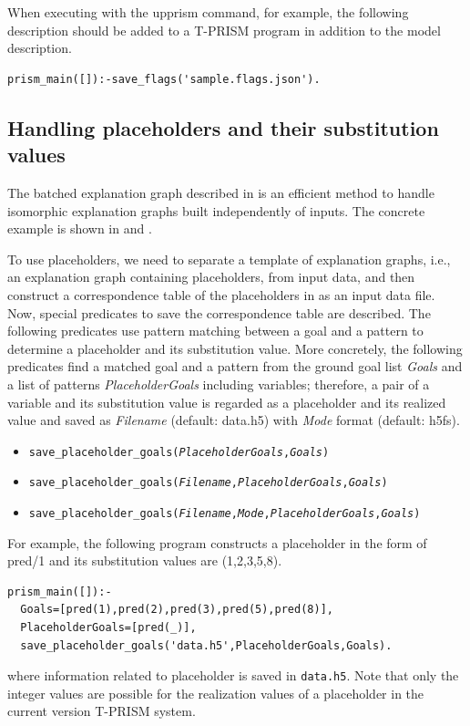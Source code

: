\documentclass[a4paper]{report}
\begin{document}
When executing with the upprism command, for example, the following description should be added to a T-PRISM program in addition to the model description.
\begin{verbatim}
prism_main([]):-save_flags('sample.flags.json').
\end{verbatim}


\subsection*{Handling placeholders and their substitution values}


The batched explanation graph described in  is an efficient method to handle isomorphic explanation graphs built independently of inputs.
The concrete example is shown in  and .

To use placeholders, we need to separate a template of explanation graphs, i.e., an explanation graph containing placeholders, from input data, and then construct a correspondence table of the placeholders in as an input data file. 
Now, special predicates to save the correspondence table are described.
The following predicates use pattern matching between a goal and a pattern to determine a placeholder and its substitution value.
More concretely, the following predicates find a matched goal and a pattern from the ground goal list {\it Goals} and a list of patterns {\it PlaceholderGoals} including variables; therefore,
a pair of a variable and its substitution value is regarded as a placeholder and its realized value and saved as {\it Filename} (default: data.h5) with {\it Mode} format (default: h5fs).

\begin{itemize}
	\item {\tt save\_placeholder\_goals({\it PlaceholderGoals},{\it Goals})}
	\item {\tt save\_placeholder\_goals({\it Filename},{\it PlaceholderGoals},{\it Goals})}
	\item {\tt save\_placeholder\_goals({\it Filename},{\it Mode},{\it PlaceholderGoals},{\it Goals})}
\end{itemize}

For example, the following program constructs a placeholder in the form of pred/1 and its substitution values are (1,2,3,5,8).
\begin{verbatim}
prism_main([]):-
  Goals=[pred(1),pred(2),pred(3),pred(5),pred(8)],
  PlaceholderGoals=[pred(_)],
  save_placeholder_goals('data.h5',PlaceholderGoals,Goals).
\end{verbatim}
where information related to placeholder is saved in {\tt data.h5}.
Note that only the integer values are possible for the realization values of a placeholder in the current version T-PRISM system.
\end{document}
